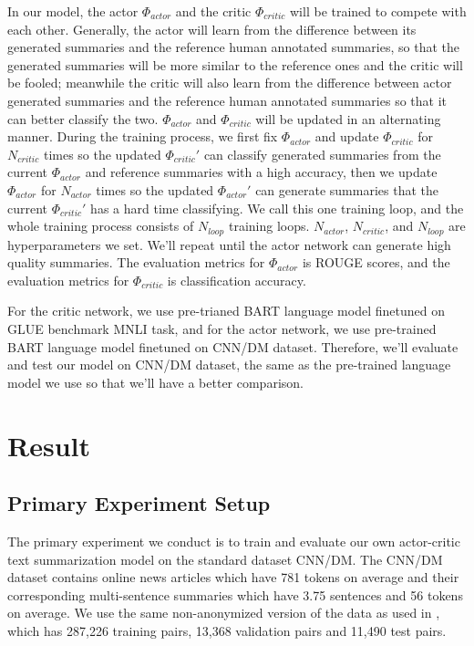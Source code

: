 \documentclass[11pt,a4paper]{article}
\begin{document}
In our model, the actor $\Phi_{actor}$ and the critic $\Phi_{critic}$ will be trained to compete with each other. Generally, the actor will learn from the difference between its generated summaries and the reference human annotated summaries, so that the generated summaries will be more similar to the reference ones and the critic will be fooled; meanwhile the critic will also learn from the difference between actor generated summaries and the reference human annotated summaries so that it can better classify the two. $\Phi_{actor}$ and $\Phi_{critic}$ will be updated in an alternating manner. During the training process, we first fix $\Phi_{actor}$ and update $\Phi_{critic}$ for $N_{critic}$ times so the updated $\Phi_{critic}'$ can classify generated summaries from the current $\Phi_{actor}$ and reference summaries with a high accuracy, then we update $\Phi_{actor}$ for $N_{actor}$ times so the updated $\Phi_{actor}'$ can generate summaries that the current $\Phi_{critic}'$ has a hard time classifying. We call this one training loop, and the whole training process consists of $N_{loop}$ training loops. $N_{actor}$, $N_{critic}$, and $N_{loop}$ are hyperparameters we set. We'll repeat until the actor network can generate high quality summaries. The evaluation metrics for $\Phi_{actor}$ is ROUGE\cite{lin-2004-rouge} scores, and the evaluation metrics for $\Phi_{critic}$ is classification accuracy.

For the critic network, we use pre-trianed BART language model finetuned on GLUE benchmark\cite{wang2018glue} MNLI task, and for the actor network, we use pre-trained BART language model finetuned on CNN/DM dataset. Therefore, we'll evaluate and test our model on CNN/DM dataset, the same as the pre-trained language model we use so that we'll have a better comparison.

\section{Result}
\label{result}
\subsection{Primary Experiment Setup}
\label{setup}

The primary experiment we conduct is to train and evaluate our own actor-critic text summarization model on the standard dataset CNN/DM. The CNN/DM dataset contains online news articles which have 781 tokens on average and their corresponding multi-sentence summaries which have 3.75 sentences and 56 tokens on average. We use the same non-anonymized version of the data as used in \cite{see2017get, yoon2020learning}, which has 287,226 training pairs, 13,368 validation pairs and 11,490 test pairs.
\end{document}
